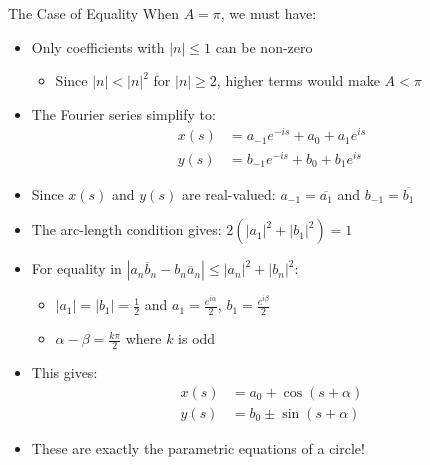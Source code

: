 \documentclass{beamer}
\begin{document}
\begin{frame}{The Case of Equality}
    When $A = \pi$, we must have:
    \begin{itemize}
        \item Only coefficients with $|n| \leq 1$ can be non-zero
            \begin{itemize}
                \item Since $|n| < |n|^2$ for $|n| \geq 2$, higher terms would make $A < \pi$
            \end{itemize}
            
        \item The Fourier series simplify to:
            \begin{align*}
                x(s) &= a_{-1}e^{-is} + a_0 + a_1e^{is} \\
                y(s) &= b_{-1}e^{-is} + b_0 + b_1e^{is}
            \end{align*}
            
        \item Since $x(s)$ and $y(s)$ are real-valued: $a_{-1} = \overline{a_1}$ and $b_{-1} = \overline{b_1}$
        
        \item The arc-length condition gives: $2(|a_1|^2 + |b_1|^2) = 1$
        
        \item For equality in $|a_n\overline{b}_n - b_n\overline{a}_n| \leq |a_n|^2 + |b_n|^2$:
            \begin{itemize}
                \item $|a_1| = |b_1| = \frac{1}{2}$ and $a_1 = \frac{e^{i\alpha}}{2}$, $b_1 = \frac{e^{i\beta}}{2}$
                \item $\alpha - \beta = \frac{k\pi}{2}$ where $k$ is odd
            \end{itemize}
            
        \item This gives:
            \begin{align*}
                x(s) &= a_0 + \cos(s + \alpha) \\
                y(s) &= b_0 \pm \sin(s + \alpha)
            \end{align*}
            
        \item These are exactly the parametric equations of a circle!
    \end{itemize}
\end{frame}
\end{document}

